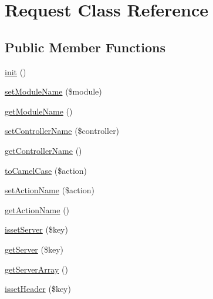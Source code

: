 \hypertarget{class_anemo_1_1_application_1_1_http_1_1_request}{
\section{Request Class Reference}
\label{class_anemo_1_1_application_1_1_http_1_1_request}
}
\subsection*{Public Member Functions}
\begin{DoxyCompactItemize}
\item 
\hyperlink{class_anemo_1_1_application_1_1_http_1_1_request_a4be4055f3361d4800e16bc2e2e38cda6}{init} ()
\item 
\hyperlink{class_anemo_1_1_application_1_1_http_1_1_request_ace12d039551ac52a70b0629a519fae41}{setModuleName} (\$module)
\item 
\hyperlink{class_anemo_1_1_application_1_1_http_1_1_request_a7e79740a77d43616dc9e0976f603fb7a}{getModuleName} ()
\item 
\hyperlink{class_anemo_1_1_application_1_1_http_1_1_request_a4e3aa0a1a35106bea24cd0cff17a661e}{setControllerName} (\$controller)
\item 
\hyperlink{class_anemo_1_1_application_1_1_http_1_1_request_a1b465007a1196146db46a2890a1391a8}{getControllerName} ()
\item 
\hyperlink{class_anemo_1_1_application_1_1_http_1_1_request_aa5d3707cdc2001602b9dd864c7fe9bae}{toCamelCase} (\$action)
\item 
\hyperlink{class_anemo_1_1_application_1_1_http_1_1_request_a3b9d4e3945e398b30382c80056b5083a}{setActionName} (\$action)
\item 
\hyperlink{class_anemo_1_1_application_1_1_http_1_1_request_a26f353f733e6f7a64eaeba330af5770e}{getActionName} ()
\item 
\hyperlink{class_anemo_1_1_application_1_1_http_1_1_request_acf267f3b1ce8fef8e84f1129038e7aa0}{issetServer} (\$key)
\item 
\hyperlink{class_anemo_1_1_application_1_1_http_1_1_request_aaf43fe7722cc0b287f3f4f658d5c8c96}{getServer} (\$key)
\item 
\hyperlink{class_anemo_1_1_application_1_1_http_1_1_request_a00f8986667c8429824a383dc9881cbb3}{getServerArray} ()
\item 
\hyperlink{class_anemo_1_1_application_1_1_http_1_1_request_a578a3544cbbe46dd7eda9eb0522c36c2}{issetHeader} (\$key)

\end{DoxyCompactItemize}
